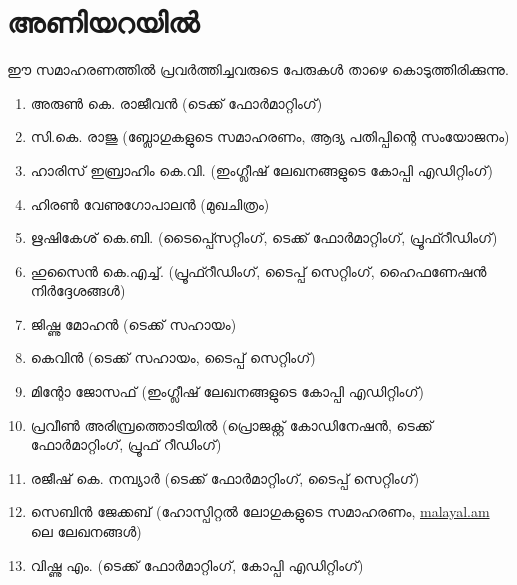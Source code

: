 ﻿\section*{അണിയറയില്‍}

ഈ സമാഹരണത്തില്‍ പ്രവര്‍ത്തിച്ചവരുടെ പേരുകള്‍ താഴെ കൊടുത്തിരിക്കുന്നു. 

\begin{enumerate}
 \item അരുണ്‍ കെ. രാജീവന്‍ (ടെക്ക് ഫോര്‍മാറ്റിംഗ്)
 \item സി.കെ. രാജു (ബ്ലോഗുകളുടെ സമാഹരണം, ആദ്യ പതിപ്പിന്റെ സംയോജനം)
 \item ഹാരിസ് ഇബ്രാഹിം  കെ.വി. (ഇംഗ്ലീഷ് ലേഖനങ്ങളുടെ കോപ്പി എഡിറ്റിംഗ്)
 \item ഹിരണ്‍ വേണുഗോപാലന്‍ (മുഖചിത്രം)
 \item ഋഷികേശ് കെ.ബി. (ടൈപ്പ്സെറ്റിംഗ്, ടെക്ക് ഫോര്‍മാറ്റിംഗ്, പ്രൂഫ്റീഡിംഗ്)
 \item ഹുസൈന്‍ കെ.എച്ച്. (പ്രൂഫ്റീഡിംഗ്, ടൈപ്പ് സെറ്റിംഗ്, ഹൈഫണേഷന്‍ നിര്‍ദ്ദേശങ്ങള്‍)
 \item ജിഷ്ണു മോഹന്‍ (ടെക്ക് സഹായം)  
 \item കെവിന്‍ (ടെക്ക് സഹായം, ടൈപ്പ് സെറ്റിംഗ്)
 \item മിന്റോ ജോസഫ് (ഇംഗ്ലീഷ് ലേഖനങ്ങളുടെ കോപ്പി എഡിറ്റിംഗ്)
 \item പ്രവീണ്‍ അരിമ്പ്രത്തൊടിയില്‍ (പ്രൊജക്റ്റ് കോഡിനേഷന്‍, ടെക്ക് ഫോര്‍മാറ്റിംഗ്, പ്രൂഫ് റീഡിംഗ്)
 \item രജീഷ് കെ. നമ്പ്യാര്‍ (ടെക്ക് ഫോര്‍മാറ്റിംഗ്, ടൈപ്പ് സെറ്റിംഗ്)
 \item സെബിന്‍ ജേക്കബ് (ഹോസ്പിറ്റല്‍ ലോഗുകളുടെ സമാഹരണം, \url{malayal.am} ലെ ലേഖനങ്ങള്‍)
 \item വിഷ്ണു എം. (ടെക്ക് ഫോര്‍മാറ്റിംഗ്, കോപ്പി എഡിറ്റിംഗ്)
\end{enumerate}

\newpage

